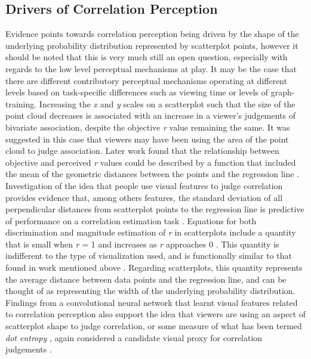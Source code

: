 \documentclass[manuscript, anonymous, screen]{acmart}
\begin{document}
\hypertarget{sec-drivers}{%
\subsection{Drivers of Correlation Perception}\label{sec-drivers}}

Evidence points towards correlation perception being driven by the shape
of the underlying probability distribution represented by scatterplot
points, however it should be noted that this is very much still an open
question, especially with regards to the low level perceptual mechanisms
at play. It may be the case that there are different contributory
perceptual mechanisms operating at different levels based on
task-specific differences such as viewing time or levels of
graph-training. Increasing the \emph{x} and \emph{y} scales on a
scatterplot such that the size of the point cloud decreases
\citep{cleveland_1982} is associated with an increase in a viewer's
judgements of bivariate association, despite the objective \emph{r}
value remaining the same. It was suggested in this case that viewers may
have been using the area of the point cloud to judge association. Later
work found that the relationship between objective and perceived
\emph{r} values could be described by a function that included the mean
of the geometric distances between the points and the regression line
\citep{meyer_1997}. Investigation of the idea that people use visual
features to judge correlation provides evidence that, among others
features, the standard deviation of all perpendicular distances from
scatterplot points to the regression line is predictive of performance
on a correlation estimation task \citep{yang_2019}. Equations for both
discrimination and magnitude estimation of \emph{r} in scatterplots
include a quantity that is small when \emph{r} = 1 and increases as
\emph{r} approaches 0 \citep{rensink_2017}. This quantity is indifferent
to the type of visualization used, and is functionally similar to that
found in work mentioned above
\citep{cleveland_1982, meyer_1997, yang_2019}. Regarding scatterplots,
this quantity represents the average distance between data points and
the regression line, and can be thought of as representing the width of
the underlying probability distribution. Findings from a convolutional
neural network that learnt visual features related to correlation
perception also support the idea that viewers are using an aspect of
scatterplot shape to judge correlation, or some measure of what has been
termed \emph{dot entropy} \citep{yang_2023}, again considered a
candidate visual proxy for correlation judgements
\citep{rensink_2017, rensink_2022}.
\end{document}
